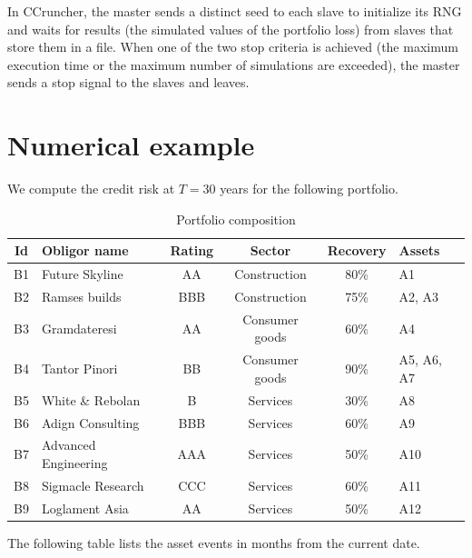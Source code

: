 \documentclass[a4paper,12pt,final]{article}
\begin{document}
In CCruncher, the master sends a distinct seed to each slave to initialize its RNG 
and waits for results (the simulated values of the portfolio loss) from slaves that 
store them in a file. When one of the two stop criteria is achieved (the maximum 
execution time or the maximum number of simulations are exceeded), the master sends 
a stop signal to the slaves and leaves.


\pagebreak
\section{Numerical example}

We compute the credit risk at $T=30$ years for the following portfolio.

\begin{table}[!h]
\begin{center}
\begin{tabular}[]{c|l|c|c|c|l}
Id  & Obligor name         & Rating & Sector         & Recovery & Assets     \\
\hline
B1  & Future Skyline       & AA     & Construction   & 80\%     & A1         \\
B2  & Ramses builds        & BBB    & Construction   & 75\%     & A2, A3     \\
B3  & Gramdateresi         & AA     & Consumer goods & 60\%     & A4         \\
B4  & Tantor Pinori        & BB     & Consumer goods & 90\%     & A5, A6, A7 \\
B5  & White \& Rebolan     & B      & Services       & 30\%     & A8         \\
B6  & Adign Consulting     & BBB    & Services       & 60\%     & A9         \\
B7  & Advanced Engineering & AAA    & Services       & 50\%     & A10        \\
B8  & Sigmacle Research    & CCC    & Services       & 60\%     & A11        \\
B9  & Loglament Asia       & AA     & Services       & 50\%     & A12        \\
\end{tabular}
\caption{Portfolio composition}
\label{example.portfolio}
\end{center}
\end{table}

The following table lists the asset events in months from the current date.
\end{document}
